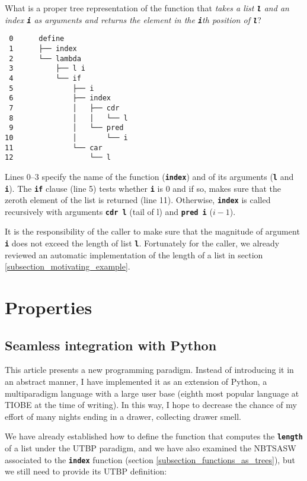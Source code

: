 \documentclass[12pt,twocolumn]{article}
\begin{document}
What is a proper tree representation of the function that \emph{takes a list \texttt{\textbf{l}} and an index \texttt{\textbf{i}} as arguments and returns the element in the \texttt{\textbf{i}}th position of \texttt{\textbf{l}}}?

\begin{verbatim}
 0      define
 1      ├── index
 2      └── lambda
 3          ├── l i
 4          └── if
 5              ├── i
 6              ├── index
 7              │   ├── cdr
 8              │   │   └── l
 9              │   └── pred
10              │       └── i
11              └── car
12                  └── l
\end{verbatim}

Lines 0--3 specify the name of the function (\texttt{\textbf{index}}) and of its arguments (\texttt{\textbf{l}} and \texttt{\textbf{i}}). The \texttt{\textbf{if}} clause (line 5) tests whether \texttt{\textbf{i}} is 0 and if so, makes sure that the zeroth element of the list is returned (line 11). Otherwise, \texttt{\textbf{index}} is called recursively with arguments \texttt{\textbf{cdr l}} (tail of l) and \texttt{\textbf{pred i}} ($i-1$).

It is the responsibility of the caller to make sure that the magnitude of argument \texttt{\textbf{i}} does not exceed the length of list \texttt{\textbf{l}}. Fortunately for the caller, we already reviewed an automatic implementation of the length of a list in section \ref{subsection_motivating_example}.

\section{Properties}
\subsection{Seamless integration with Python}
This article presents a new programming paradigm. Instead of introducing it in an abstract manner, I have implemented it as an extension of Python, a multiparadigm language with a large user base (eighth most popular language at TIOBE at the time of writing\cite{TIOBE}). In this way, I hope to decrease the chance of my effort of many nights ending in a drawer, collecting drawer smell.

We have already established how to define the function that computes the \texttt{\textbf{length}} of a list under the UTBP paradigm, and we have also examined the NBTSASW associated to the \texttt{\textbf{index}} function (section \ref{subsection_functions_as_trees}), but we still need to provide its UTBP definition:
\end{document}
